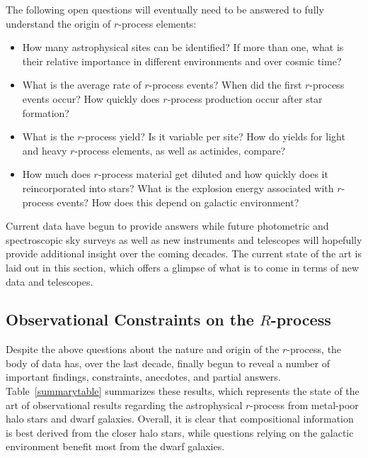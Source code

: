 \documentclass[letterpaper]{article}
\begin{document}
The following open questions will eventually need to be answered to fully understand the origin of $r$-process elements:  

\begin{itemize}
\item How many astrophysical sites can be identified? If more than one, what is their relative importance in different environments and over cosmic time?
\item What is the average rate of $r$-process events? When did the first $r$-process events occur? How quickly does $r$-process production occur after star formation?
\item What is the $r$-process yield? Is it variable per site? How do yields for light and heavy $r$-process elements, as well as actinides, compare? 
\item How much does $r$-process material get diluted and how quickly does it reincorporated into stars? What is the explosion energy associated with $r$-process events? How does this depend on galactic environment?
\end{itemize}

Current data have begun to provide answers while future photometric and spectroscopic sky surveys as well as new instruments and telescopes will hopefully provide additional insight over the coming decades. The current state of the art is laid out in this section, which offers a glimpse of what is to come in terms of new data and telescopes.

\subsection{Observational Constraints on the $R$-process}

Despite the above questions about the nature and origin of the $r$-process, the body of data has, over the last decade, finally begun to reveal a number of important findings, constraints, anecdotes, and partial answers. 
Table~\ref{summarytable} summarizes these results, which represents the state of the art of observational results regarding the astrophysical $r$-process from metal-poor halo stars and dwarf galaxies.
Overall, it is clear that compositional information is best derived from the closer halo stars, while questions relying on the galactic environment benefit most from the dwarf galaxies.
\end{document}
